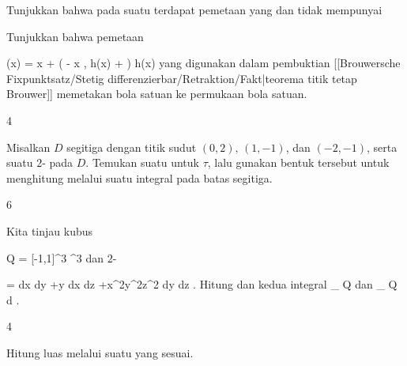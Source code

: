 {}
{

Tunjukkan bahwa pada suatu
terdapat pemetaan
 yang
dan tidak mempunyai

}
{} {}

{}
{

Tunjukkan bahwa pemetaan

\mavergleichskettedisp
{\vergleichskette
{ \varphi(x)
}
{ =} { x + \left( - \left\langle  x  , h(x)  \right\rangle + \right) \cdot h(x)
}
{ } {
}
{ } {
}
{ } {
}
}
{}{}{}
 {} {}
yang digunakan dalam pembuktian
[[Brouwersche Fixpunktsatz/Stetig differenzierbar/Retraktion/Fakt|teorema titik tetap Brouwer]]
memetakan bola satuan ke permukaan bola satuan.

}
{} {}


{4}
{

Misalkan $D$ segitiga dengan titik sudut
$(0,2),\, (1,-1)$, dan $(-2,-1)$,
serta
 suatu
$2$- pada $D$. Temukan suatu
 untuk $\tau$, lalu gunakan bentuk tersebut untuk menghitung
 melalui suatu integral pada batas segitiga.

}
{} {}

{6}
{

Kita tinjau kubus

\mavergleichskettedisp
{\vergleichskette
{ Q
}
{ =} { [-1,1]^3
}
{ \subseteq} { \R^3
}
{ } {
}
{ } {
}
}
{}{}{}
dan
$2$-

\mavergleichskettedisp
{\vergleichskette
{ \omega
}
{ =} { dx \wedge dy +y dx \wedge dz +x^2y^2z^2 dy \wedge dz
}
{ } {
}
{ } {
}
{ } {
}
}
{}{}{.}
Hitung
 dan kedua integral
\mathkor {} {\int_{  \partial Q  }   \omega} {dan} {\int_{  Q  }  d \omega} {}
 {} {.}

}
{} {}

{4}
{

Hitung luas
melalui suatu
yang sesuai.

}
{} {}


